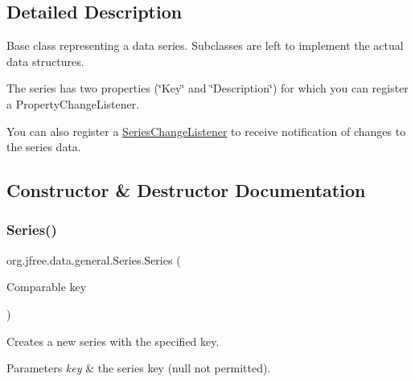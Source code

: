 \subsection{Detailed Description}
Base class representing a data series. Subclasses are left to implement the actual data structures. 

The series has two properties (\char`\"{}\+Key\char`\"{} and \char`\"{}\+Description\char`\"{}) for which you can register a {\ttfamily Property\+Change\+Listener}. 

You can also register a \mbox{\hyperlink{interfaceorg_1_1jfree_1_1data_1_1general_1_1_series_change_listener}{Series\+Change\+Listener}} to receive notification of changes to the series data. 

\subsection{Constructor \& Destructor Documentation}
\mbox{\label{classorg_1_1jfree_1_1data_1_1general_1_1_series_ac6fa61b6422c85047cb83a800f417f25}} 
\subsubsection{\texorpdfstring{Series()}{Series()}\hspace{0.1cm}{\footnotesize\ttfamily [1/2]}}
{\footnotesize\ttfamily org.\+jfree.\+data.\+general.\+Series.\+Series (\begin{DoxyParamCaption}\item[{Comparable}]{key }\end{DoxyParamCaption})\hspace{0.3cm}{\ttfamily [protected]}}

Creates a new series with the specified key.


\begin{DoxyParams}{Parameters}
{\em key} & the series key ({\ttfamily null} not permitted). \\
\hline
\end{DoxyParams}
\mbox{\label{classorg_1_1jfree_1_1data_1_1general_1_1_series_af5897ef93189a672b9dc02e6facfba94}} 
